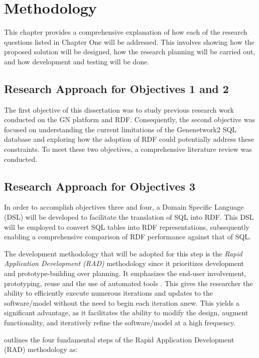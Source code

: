 \chapter{Methodology}

This chapter provides a comprehensive explanation of how each of the research questions listed in Chapter One will be addressed.  This involves showing how the proposed solution will be designed, how the research planning will be carried out, and how development and testing will be done.  

\section{Research Approach for Objectives 1 and 2}

The first objective of this dissertation was to study previous research work conducted on the GN platform and RDF.  Consequently, the second objective was focused on understanding the current limitations of the Genenetwork2 SQL database and exploring how the adoption of RDF could potentially address these constraints.  To meet these two objectives, a comprehensive literature review was conducted.

\section{Research Approach for Objectives 3}

In order to accomplish objectives three and four, a Domain Specific Language (DSL) will be developed to facilitate the translation of SQL into RDF.  This DSL will be employed to convert SQL tables into RDF representations, subsequently enabling a comprehensive comparison of RDF performance against that of SQL.

The development methodology that will be adopted for this step is the \textit{Rapid Application Development (RAD)} methodology since it prioritizes development and prototype-building over planning.  It emphasizes the end-user involvement, prototyping, reuse and the use of automated tools \citep*{van2008software}.  This gives the researcher the ability to efficiently execute numerous iterations and updates to the software/model without the need to begin each iteration anew.  This yields a significant advantage, as it facilitates the ability to modify the design, augment functionality, and iteratively refine the software/model at a high frequency.

\citet*{van2008software} outlines the four fundamental steps of the Rapid Application Development (RAD) methodology as:

